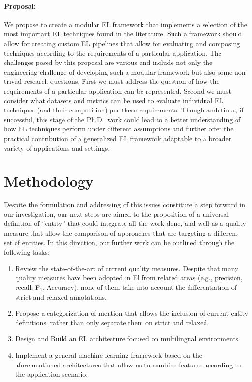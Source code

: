 \documentclass[sigconf]{acmart}
\begin{document}
\paragraph{Proposal:} We propose to create a modular EL framework that implements a selection of the most important EL techniques found in the literature. Such a framework should allow for creating custom EL pipelines that allow for evaluating and composing techniques according to the requirements of a particular application. The challenges posed by this proposal are various and include not only the engineering challenge of developing such a modular framework but also some non-trivial research questions. First we must address the question of how the requirements of a particular application can be represented. Second we must consider what datasets and metrics can be used to evaluate individual EL techniques (and their composition) per these requirements. Though ambitious, if successful, this stage of the Ph.D.\ work could lead to a better understanding of how EL techniques perform under different assumptions and further offer the practical contribution of a generalized EL framework adaptable to a broader variety of applications and settings.

\section{Methodology}

Despite the formulation and addressing of this issues constitute a step forward in our investigation, our next steps are aimed to the proposition of a universal definition of ``entity'' that could integrate all the work done, and well as a quality measure that allow the comparison of approaches that are targeting a different set of entities. In this direction, our further work can be outlined through the following tasks:

\begin{enumerate}
    \item Review the state-of-the-art of current quality measures. Despite that many quality measures have been adopted in El from related areas (e.g., precision, recall, F$_1$, Accuracy), none of them take into account the differentiation of strict and relaxed annotations. 
    
    \item Propose a categorization of mention that allows the inclusion of current entity definitions, rather than only separate them on strict and relaxed.
    \item Design and Build an EL architecture focused on multilingual environments.
    \item Implement a general machine-learning framework based on the aforementioned architectures that allow us to combine features according to the application scenario.
    
    
\end{enumerate}
\end{document}

